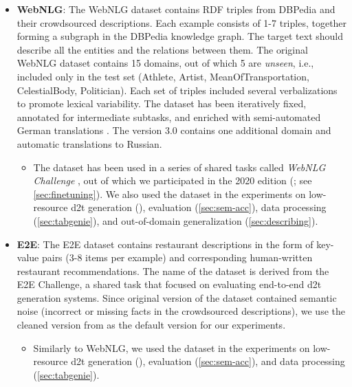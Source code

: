 \begin{itemize}
    \item \textbf{WebNLG}: The WebNLG dataset \cite{gardentCreatingTrainingCorpora2017,gardentWebNLGChallengeGenerating2017} contains RDF triples from DBPedia \cite{auer2007dbpedia} and their crowdsourced descriptions. Each example consists of 1-7 triples, together forming a subgraph in the DBPedia knowledge graph. The target text should describe all the entities and the relations between them. The original WebNLG dataset \cite{gardentCreatingTrainingCorpora2017} contains 15 domains, out of which 5 are \emph{unseen}, i.e., included only in the test set (Athlete, Artist, MeanOfTransportation, CelestialBody, Politician). Each set of triples included several verbalizations to promote lexical variability. The dataset has been iteratively fixed, annotated for intermediate subtasks, and enriched with semi-automated German translations \cite{castroferreiraEnrichingWebNLGCorpus2018}. The version 3.0 \cite{ferreira20202020} contains one additional domain and automatic translations to Russian.
          \begin{itemize}
              \item
                    The dataset has been used in a series of shared tasks called \emph{WebNLG Challenge} \cite{gardentWebNLGChallengeGenerating2017,shimorinaWebNLGChallengeHuman2019,ferreira20202020,cripwell2023WebNLGShared2023}, out of which we participated in the 2020 edition (\citealp{ferreira20202020}; see \autoref{sec:finetuning}). We also used the dataset in the experiments on low-resource \ac{d2t} generation (), evaluation (\autoref{sec:sem-acc}), data processing (\autoref{sec:tabgenie}), and out-of-domain generalization (\autoref{sec:describing}).
          \end{itemize}

    \item \textbf{E2E}: The E2E dataset \cite{dusekEvaluatingStateoftheartEndtoEnd2020} contains restaurant descriptions in the form of key-value pairs (3-8 items per example) and corresponding human-written restaurant recommendations. The name of the dataset is derived from the E2E Challenge, a shared task that focused on evaluating end-to-end \ac{d2t} generation systems. Since original version of the dataset contained semantic noise (incorrect or missing facts in the crowdsourced descriptions), we use the cleaned version from \citet{dusekSemanticNoiseMatters2019} as the default version for our experiments.
          \begin{itemize}
              \item
                    Similarly to WebNLG, we used the dataset in the experiments on low-resource \ac{d2t} generation (), evaluation (\autoref{sec:sem-acc}), and data processing (\autoref{sec:tabgenie}).
          \end{itemize}


\end{itemize}
